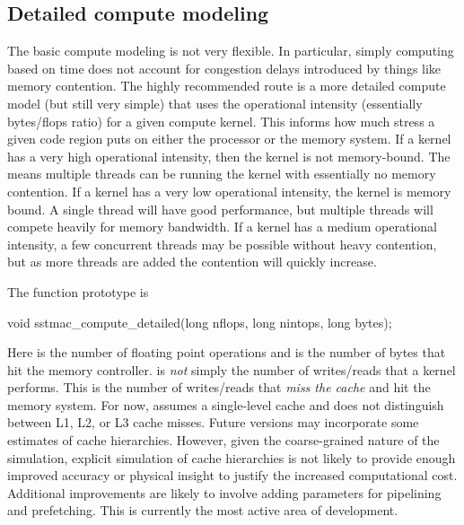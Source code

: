 \subsection{Detailed compute modeling}
The basic compute modeling is not very flexible.  
In particular, simply computing based on time does not account for congestion delays introduced by things like memory contention.
The highly recommended route is a more detailed compute model (but still very simple) that uses the operational intensity (essentially bytes/flops ratio) for a given compute kernel.
This informs \sstmacro how much stress a given code region puts on either the processor or the memory system.
If a kernel has a very high operational intensity, then the kernel is not memory-bound.
The means multiple threads can be running the kernel with essentially no memory contention.
If a kernel has a very low operational intensity, the kernel is memory bound.
A single thread will have good performance, but multiple threads will compete heavily for memory bandwidth.
If a kernel has a medium operational intensity, a few concurrent threads may be possible without heavy contention, 
but as more threads are added the contention will quickly increase.

The function prototype is

\begin{CppCode}
void
sstmac_compute_detailed(long nflops, long nintops, long bytes);
\end{CppCode}
Here  is the number of floating point operations and  is the number of bytes that hit the memory controller.
 is \emph{not} simply the number of writes/reads that a kernel performs.
This is the number of writes/reads that \emph{miss the cache} and hit the memory system.
For now, \sstmacro assumes a single-level cache and does not distinguish between L1, L2, or L3 cache misses.
Future versions may incorporate some estimates of cache hierarchies.
However, given the coarse-grained nature of the simulation, explicit simulation of cache hierarchies is not likely to provide enough improved accuracy or physical insight to justify the increased computational cost. 
Additional improvements are likely to involve adding parameters for pipelining and prefetching.
This is currently the most active area of \sstmacro development.

